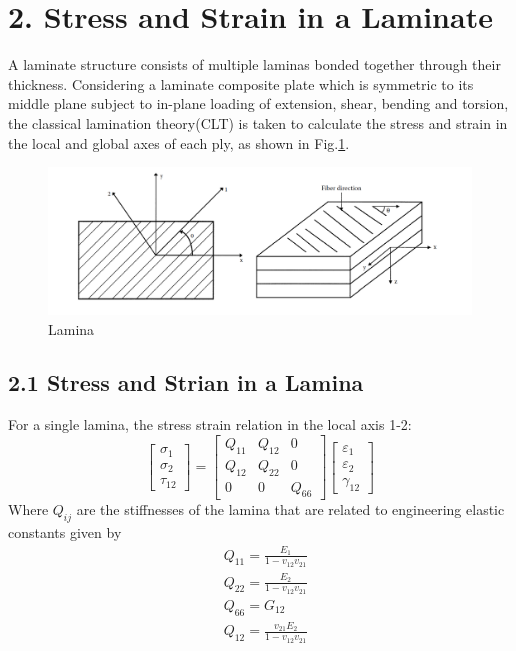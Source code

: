 \documentclass[Afour,sagev,times]{sagej}
\begin{document}
\section{2. Stress and Strain in a Laminate}
A laminate structure consists of multiple laminas bonded together through
their thickness.  Considering a laminate composite plate which is symmetric to
its middle plane subject to in-plane loading of extension, shear, bending
and torsion,  the classical lamination theory(CLT) is taken to calculate the
stress and strain in the local and global axes of each ply, as shown in
Fig.\ref{fig:lamina}.

\begin{figure}
	\centering
	\includegraphics[width=\linewidth]{A_laminate_design_images/lamina_local_global_axes.png}
	\caption{Lamina}
  	\label{fig:lamina}
\end{figure}


\subsection{2.1 Stress and Strian in a Lamina}
For a single lamina, the stress strain relation in the local axis 1-2: 
\begin{equation}
    \begin{bmatrix}
        \sigma_1\\
        \sigma_2\\
        \tau_{12}
    \end{bmatrix}
    =
    \begin{bmatrix}
        Q_{11} & Q_{12} & 0\\
        Q_{12} & Q_{22} & 0\\
        0      &  0     & Q_{66}
    \end{bmatrix}
    \begin{bmatrix}
        \varepsilon_1\\
        \varepsilon_2\\
		\gamma_{12}
    \end{bmatrix}
\end{equation}
Where $Q_{ij}$ are the stiffnesses of the lamina that are related to 
engineering elastic constants given by
\begin{equation}
    \begin{split}
    &Q_{11}=\frac{E_1}{1-v_{12}v_{21}}\\
    &Q_{22}=\frac{E_2}{1-v_{12}v_{21}}\\
    &Q_{66}=G_{12}\\
    &Q_{12}=\frac{v_{21}E_2}{1-v_{12}v_{21}}\\
    \end{split}
\end{equation}
\end{document}
